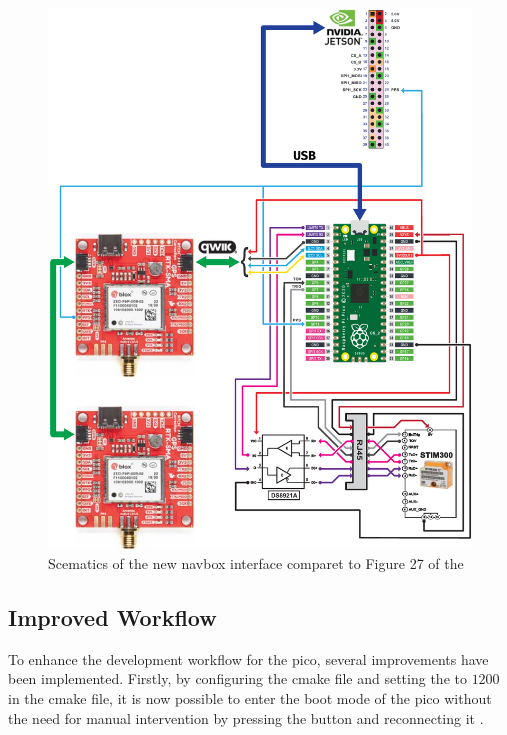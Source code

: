 \begin{figure}[H]
    \centering
    \includegraphics[width=\textwidth]{figures/navbox/navbox_usb.pdf}
    \caption{Scematics of the new \gls{navbox} interface comparet to Figure 27 of the \preproject}
    \label{fig:navbox_usb}
\end{figure}

\subsection{Improved Workflow}

To enhance the development workflow for the \gls{pico}, several improvements have been implemented.
Firstly, by configuring the \gls{cmake} file and setting the  to $1200$ in the \gls{cmake} file, it is now possible to enter the boot mode of the \gls{pico} without the need for manual intervention by pressing the  button and reconnecting it \cite{hermannswAnswerSettingUsb2021}.

